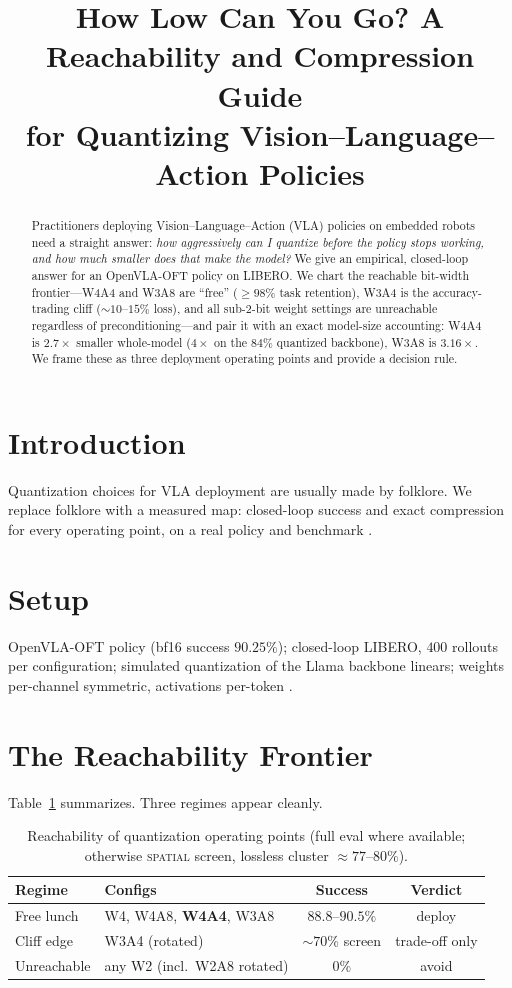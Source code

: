 \documentclass[conference]{IEEEtran}
\title{How Low Can You Go? A Reachability and Compression Guide\\
for Quantizing Vision--Language--Action Policies}
\author{
\IEEEauthorblockN{Justin Williams, Kishor Datta Gupta, Roy George, Mrinmoy Sarkar}
\IEEEauthorblockA{Clark Atlanta University \quad \texttt{justinwilliamstech693@gmail.com}}
}
\begin{document}
\maketitle

\begin{abstract}
Practitioners deploying Vision--Language--Action (VLA) policies on embedded robots need a
straight answer: \emph{how aggressively can I quantize before the policy stops working, and
how much smaller does that make the model?} We give an empirical, closed-loop answer for an
OpenVLA-OFT policy on LIBERO. We chart the reachable bit-width frontier---W4A4 and W3A8 are
``free'' ($\geq\!98\%$ task retention), W3A4 is the accuracy-trading cliff
($\sim\!10$--$15\%$ loss), and all sub-2-bit weight settings are unreachable regardless of
preconditioning---and pair it with an exact model-size accounting: W4A4 is $2.7\times$
smaller whole-model ($4\times$ on the $84\%$ quantized backbone), W3A8 is $3.16\times$.
We frame these as three deployment operating points and provide a decision rule.
\end{abstract}

\section{Introduction}
Quantization choices for VLA deployment are usually made by folklore. We replace folklore
with a measured map: closed-loop success and exact compression for every operating point,
on a real policy and benchmark \cite{openvlaoft,libero}.

\section{Setup}
OpenVLA-OFT policy (bf16 success $90.25\%$); closed-loop LIBERO, $400$ rollouts per
configuration; simulated quantization of the Llama backbone linears; weights per-channel
symmetric, activations per-token \cite{quarot}.

\section{The Reachability Frontier}
Table~\ref{tab:reach} summarizes. Three regimes appear cleanly.

\begin{table}[h]\centering
\caption{Reachability of quantization operating points (full eval where available;
otherwise \textsc{spatial} screen, lossless cluster $\approx 77$--$80\%$).}
\label{tab:reach}
\begin{tabular}{llcc}
\toprule
Regime & Configs & Success & Verdict \\
\midrule
Free lunch & W4, W4A8, \textbf{W4A4}, W3A8 & $88.8$--$90.5\%$ & deploy \\
Cliff edge & W3A4 (rotated) & $\sim\!70\%$ screen & trade-off only \\
Unreachable & any W2 (incl.\ W2A8 rotated) & $0\%$ & avoid \\
\bottomrule
\end{tabular}
\end{table}
\end{document}
